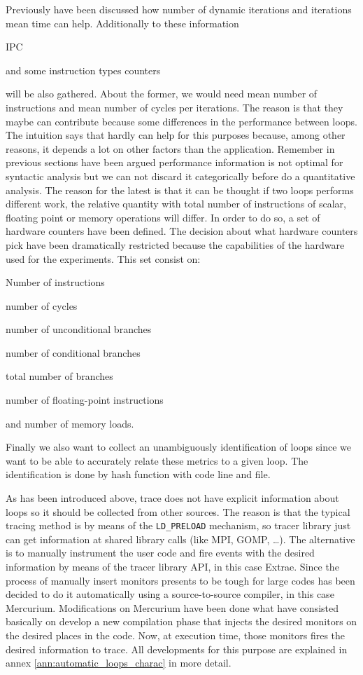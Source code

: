 Previously have been discussed how number of dynamic 
iterations and iterations mean time can help. Additionally to these information
\begin{enumerate*}[label=\roman*)]
    \item IPC 
    \item and some instruction types counters 
\end{enumerate*}
will be also gathered.
About the former, we would need mean number of instructions and mean number of 
cycles per iterations. The reason is that they maybe can contribute because some 
differences in the performance between loops. The intuition says that
hardly can help for this purposes because, among other reasons, it depends a lot
on other factors than the application. Remember in previous sections have been argued
performance information is not optimal for syntactic analysis but we can not
discard it categorically before do a quantitative analysis. The reason for the
latest is that it can be thought if two loops performs different work, the
relative quantity with total number of instructions of scalar, floating point 
or memory operations will differ. In order to do so, a set of hardware
counters have been defined. The decision about what hardware counters
pick have been dramatically restricted because the capabilities of the
hardware used for the experiments. This set consist on:
\begin{enumerate*}[label=\roman*)]
  \item Number of instructions
  \item number of cycles 
  \item number of unconditional branches
  \item number of conditional branches 
  \item total number of branches
  \item number of floating-point instructions
  \item and number of memory loads.
\end{enumerate*}
Finally we also want to collect an unambiguously identification of loops
since we want to be able to accurately relate these metrics to a given loop.
The identification is done by hash function with code line and file.

As has been introduced above, trace does not have explicit information about 
loops so it should be collected from other sources. The reason is that the typical
tracing method is by means of the {\tt LD\_PRELOAD} mechanism, so tracer library just
can get information at shared library calls (like MPI, GOMP, \dots). The alternative
is to manually instrument the user code and fire events with the desired information
by means of the tracer library API, in this case Extrae. Since the process of
manually insert monitors presents to be tough for large codes has been decided
to do it automatically using a source-to-source compiler, in this case
Mercurium. Modifications on Mercurium have been done what have consisted
basically on develop a new compilation phase that injects the desired
monitors on the desired places in the code. Now, at execution time, those
monitors  fires the desired information to trace. 
All developments for this purpose are explained in annex \ref{ann:automatic_loops_charac} 
in more detail.

